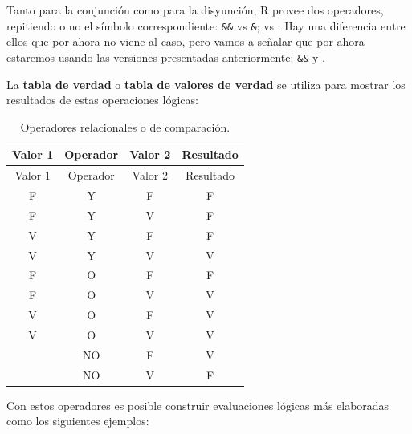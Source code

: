 \documentclass[
]{book}
\begin{document}
Tanto para la conjunción como para la disyunción, R provee dos operadores, repitiendo o no el símbolo correspondiente: \texttt{\&\&} vs \texttt{\&}; \texttt{\textbar{}\textbar{}} vs \texttt{\textbar{}}. Hay una diferencia entre ellos que por ahora no viene al caso, pero vamos a señalar que por ahora estaremos usando las versiones presentadas anteriormente: \texttt{\&\&} y \texttt{\textbar{}\textbar{}}.

La \textbf{tabla de verdad} o \textbf{tabla de valores de verdad} se utiliza para mostrar los resultados de estas operaciones lógicas:

\begin{longtable}[]{@{}cccc@{}}
\caption{\label{tab:verdad} Operadores relacionales o de comparación.}\tabularnewline
\toprule
Valor 1 & Operador & Valor 2 & Resultado \\
\midrule
\endfirsthead
\toprule
Valor 1 & Operador & Valor 2 & Resultado \\
\midrule
\endhead
F & Y & F & F \\
F & Y & V & F \\
V & Y & F & F \\
V & Y & V & V \\
F & O & F & F \\
F & O & V & V \\
V & O & F & V \\
V & O & V & V \\
& NO & F & V \\
& NO & V & F \\
\bottomrule
\end{longtable}

Con estos operadores es posible construir evaluaciones lógicas más elaboradas como los siguientes ejemplos:
\end{document}
